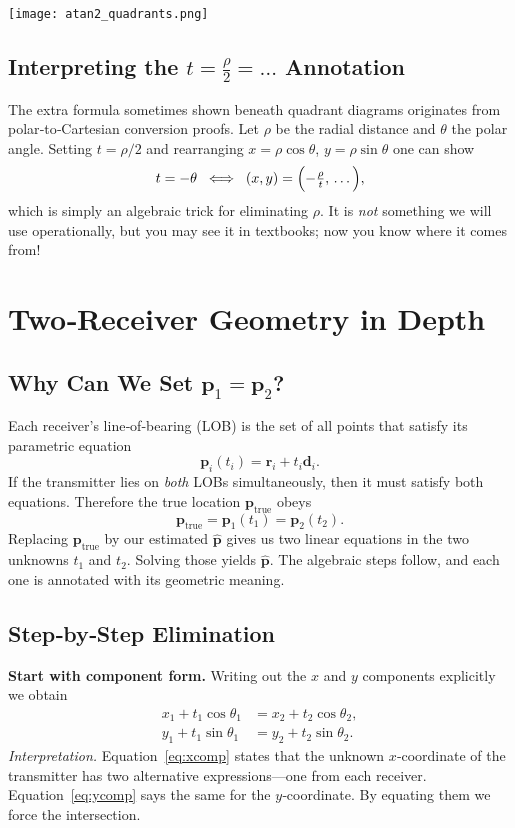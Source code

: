 \documentclass[11pt]{article}
\begin{document}
\begin{center}
  \texttt{[image: atan2\_quadrants.png]}
  \label{fig:atan2again}
\end{center}

\subsection{Interpreting the $t=\frac{\rho}{2}=\dots$ Annotation}
\label{subsec:rhotheta}
The extra formula sometimes shown beneath quadrant diagrams originates from polar‑to‑Cartesian conversion proofs.  Let $\rho$ be the radial distance and $\theta$ the polar angle.  Setting $t=\rho/2$ and rearranging $x=\rho\cos\theta$, $y=\rho\sin\theta$ one can show
\[
  t=-\theta\;\;\Longleftrightarrow\;\;(x,y)=\Bigl(-\tfrac{\rho}{t},\,\dots\Bigr),
\]
which is simply an algebraic trick for eliminating $\rho$.  It is \emph{not} something we will use operationally, but you may see it in textbooks; now you know where it comes from!

\section{Two‑Receiver Geometry in Depth}
\subsection{Why Can We Set $\mathbf p_1=\mathbf p_2$?}
Each receiver’s line‑of‑bearing (LOB) is the set of all points that satisfy its parametric equation
\[\mathbf p_i(t_i)=\mathbf r_i+t_i\mathbf d_i.\]
If the transmitter lies on \emph{both} LOBs simultaneously, then it must satisfy both equations.  Therefore the true location $\mathbf p_{\text{true}}$ obeys
\[\mathbf p_{\text{true}}=\mathbf p_1(t_1)=\mathbf p_2(t_2).\]
Replacing $\mathbf p_{\text{true}}$ by our estimated $\hat{\mathbf p}$ gives us two linear equations in the two unknowns $t_1$ and $t_2$.  Solving those yields $\hat{\mathbf p}$.  The algebraic steps follow, and each one is annotated with its geometric meaning.

\subsection{Step‑by‑Step Elimination}
\textbf{Start with component form.}  Writing out the $x$ and $y$ components explicitly we obtain
\begin{align}
  x_1 + t_1\cos\theta_1 &= x_2 + t_2\cos\theta_2,\label{eq:xcomp}\\
  y_1 + t_1\sin\theta_1 &= y_2 + t_2\sin\theta_2.\label{eq:ycomp}
\end{align}
\emph{Interpretation.}  Equation~\eqref{eq:xcomp} states that the unknown $x$‑coordinate of the transmitter has two alternative expressions—one from each receiver.  Equation~\eqref{eq:ycomp} says the same for the $y$‑coordinate.  By equating them we force the intersection.
\end{document}

